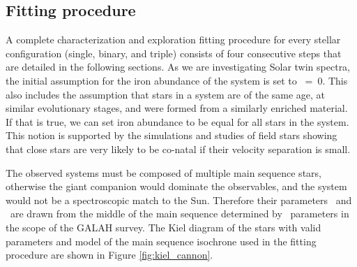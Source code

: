 \subsection{Fitting procedure}
A complete characterization and exploration fitting procedure for every stellar configuration (single, binary, and triple) consists of four consecutive steps that are detailed in the following sections. As we are investigating Solar twin spectra, the initial assumption for the iron abundance of the system is set to \Feh~=~$0$. This also includes the assumption that stars in a system are of the same age, at similar evolutionary stages, and were formed from a similarly enriched material. If that is true, we can set iron abundance to be equal for all stars in the system. This notion is supported by the simulations \citep{2019arXiv190210719K} and studies \citep{2019arXiv190402159K} of field stars showing that close stars are very likely to be co-natal if their velocity separation is small.

The observed systems must be composed of multiple main sequence stars, otherwise the giant companion would dominate the observables, and the system would not be a spectroscopic match to the Sun. Therefore their parameters \Teff\ and \Logg\ are drawn from the middle of the main sequence determined by \TC\ parameters in the scope of the GALAH survey. The Kiel diagram of the stars with valid parameters and model of the main sequence isochrone used in the fitting procedure are shown in Figure \ref{fig:kiel_cannon}.

